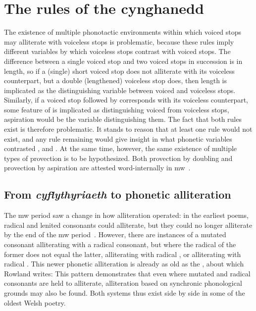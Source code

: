 \section{The rules of the cynghanedd}
\label{sec:rules-cynghanedd}

 The existence of multiple phonotactic environments within which voiced stops may alliterate with voiceless stops is problematic, because these rules imply different variables by which voiceless stops contrast with voiced stops. The difference between a single voiced stop and two voiced stops in succession is in length, so if a (single) short voiced stop does not alliterate with its voiceless counterpart, but a double (lengthened) voiceless stop does, then  length is implicated as the distinguishing variable between voiced and voiceless stops. Similarly, if a voiced stop followed by  corresponds with its voiceless counterpart, some feature of  is implicated as distinguishing voiced from voiceless stops, \ie aspiration would be the variable distinguishing them. The fact that both rules exist is therefore problematic. It stands to reason that at least one rule would not exist, and any rule remaining would give insight in what phonetic variables contrasted , and . At the same time, however, the same existence of multiple types of provection is to be hypothesized. Both provection by doubling and provection by aspiration are attested word-internally in \gls{mw}~\autocite[\S 17]{evans_grammar_1964}.

\subsection{From \textit{cyflythyriaeth} to phonetic alliteration}
\label{sec:from-allit-text}
The \gls{mw} period saw a change in how alliteration operated: in the earliest poems, radical and lenited consonants could alliterate, but they could no longer alliterate by the end of the \gls{mw} period~\autocite[339]{rowland_early_1990}. However, there are instances of a mutated consonant alliterating with a radical consonant, but where the radical of the former does not equal the latter, \eg {} alliterating with radical , or  alliterating with radical . This newer phonetic alliteration is already as old as the , about which Rowland writes: 
This pattern demonstrates that even where mutated and radical consonants are held to alliterate, alliteration based on synchronic phonological grounds may also be found. Both systems thus exist side by side in some of the oldest Welsh poetry. 

